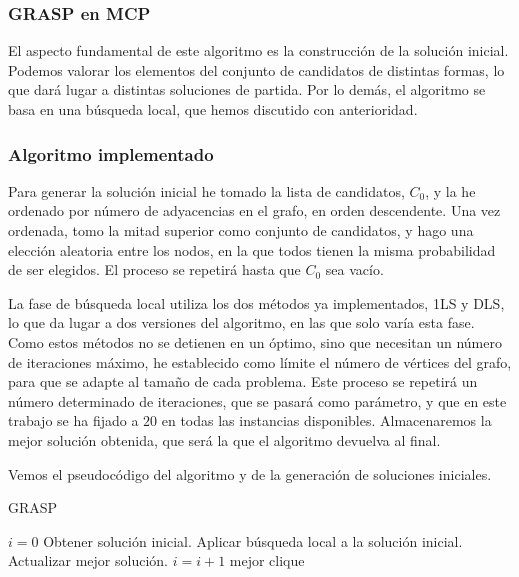\subsubsection{GRASP en MCP}

El aspecto fundamental de este algoritmo es la construcción de la solución inicial.
Podemos valorar los elementos del conjunto de candidatos de distintas formas, lo que
dará lugar a distintas soluciones de partida. Por lo demás, el algoritmo se basa en
una búsqueda local, que hemos discutido con anterioridad.

\subsubsection{Algoritmo implementado}

Para generar la solución inicial he tomado la lista de candidatos, $C_0$, y la he ordenado
por número de adyacencias en el grafo, en orden descendente. Una vez ordenada, tomo la
mitad superior como conjunto de candidatos, y hago una elección aleatoria entre los nodos,
en la que todos tienen la misma probabilidad de ser elegidos. El proceso se repetirá hasta
que $C_0$ sea vacío.

La fase de búsqueda local utiliza los dos métodos ya implementados, 1LS y DLS, lo que da
lugar a dos versiones del algoritmo, en las que solo varía esta fase. Como estos métodos
no se detienen en un óptimo, sino que necesitan un número de iteraciones máximo, he
establecido como límite el número de vértices del grafo, para que se adapte al tamaño
de cada problema. Este proceso se repetirá un número determinado de iteraciones, que
se pasará como parámetro, y que en este trabajo se ha fijado a $20$ en todas las instancias
disponibles. Almacenaremos la mejor solución obtenida, que será la que el algoritmo
devuelva al final.

Vemos el pseudocódigo del algoritmo y de la generación de soluciones iniciales.

\begin{algorithm}[H]
\caption{GRASP}
  \begin{algorithmic}
    \State $i = 0$
  \Repeat
    \State Obtener solución inicial.
    \State Aplicar búsqueda local a la solución inicial.
    \State Actualizar mejor solución.
    \State $i = i+1$
  \Return mejor clique
  \EndFunction
  \end{algorithmic}
\end{algorithm}

